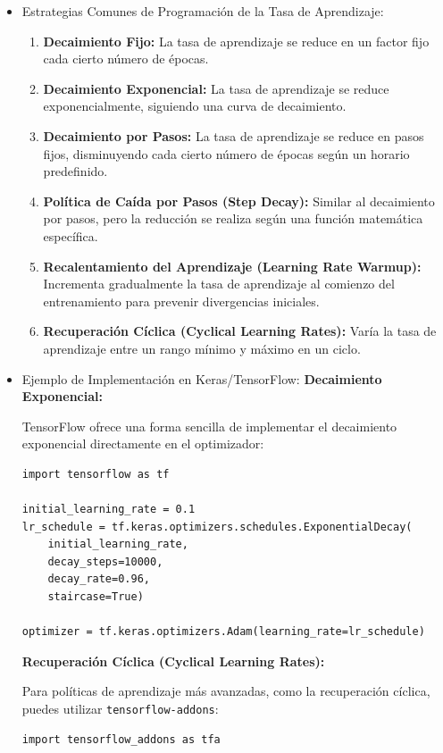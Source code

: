 \documentclass[11pt]{article}
\begin{document}
\begin{itemize}
\item Estrategias Comunes de Programación de la Tasa de Aprendizaje:
\label{sec:org0dd894c}
\begin{enumerate}
\item \textbf{Decaimiento Fijo:} La tasa de aprendizaje se reduce en un factor
fijo cada cierto número de épocas.
\item \textbf{Decaimiento Exponencial:} La tasa de aprendizaje se reduce
exponencialmente, siguiendo una curva de decaimiento.
\item \textbf{Decaimiento por Pasos:} La tasa de aprendizaje se reduce en pasos
fijos, disminuyendo cada cierto número de épocas según un horario
predefinido.
\item \textbf{Política de Caída por Pasos (Step Decay):} Similar al decaimiento
por pasos, pero la reducción se realiza según una función matemática
específica.
\item \textbf{Recalentamiento del Aprendizaje (Learning Rate Warmup):} Incrementa
gradualmente la tasa de aprendizaje al comienzo del entrenamiento
para prevenir divergencias iniciales.
\item \textbf{Recuperación Cíclica (Cyclical Learning Rates):} Varía la tasa de
aprendizaje entre un rango mínimo y máximo en un ciclo.
\end{enumerate}

\item Ejemplo de Implementación en Keras/TensorFlow:
\label{sec:org5f5387b}
\textbf{Decaimiento Exponencial:}

TensorFlow ofrece una forma sencilla de implementar el decaimiento
exponencial directamente en el optimizador:

\begin{verbatim}
import tensorflow as tf

initial_learning_rate = 0.1
lr_schedule = tf.keras.optimizers.schedules.ExponentialDecay(
    initial_learning_rate,
    decay_steps=10000,
    decay_rate=0.96,
    staircase=True)

optimizer = tf.keras.optimizers.Adam(learning_rate=lr_schedule)
\end{verbatim}

\textbf{Recuperación Cíclica (Cyclical Learning Rates):}

Para políticas de aprendizaje más avanzadas, como la recuperación
cíclica, puedes utilizar \texttt{tensorflow-addons}:

\begin{verbatim}
import tensorflow_addons as tfa


\end{verbatim}
\end{itemize}
\end{document}
